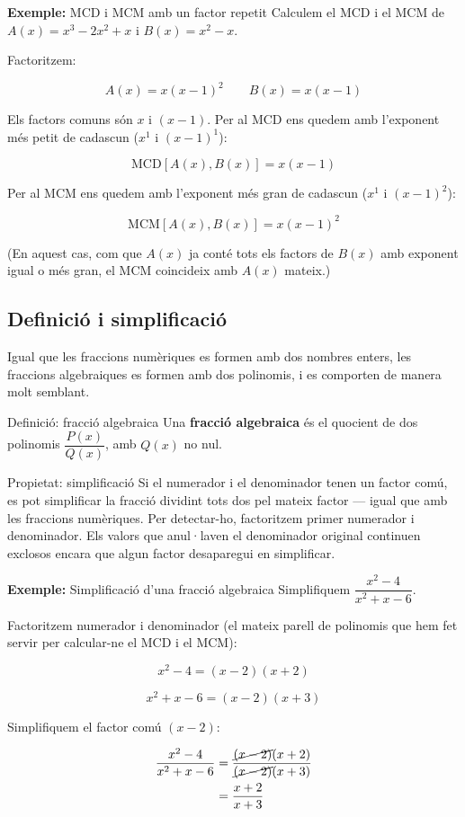 \begin{exemple}{\textbf{Exemple:} MCD i MCM amb un factor repetit}
Calculem el MCD i el MCM de $A(x)=x^3-2x^2+x$ i $B(x)=x^2-x$.

Factoritzem:

\[
A(x) = x(x-1)^2 \qquad B(x) = x(x-1)
\]

Els factors comuns són $x$ i $(x-1)$. Per al MCD ens quedem amb l'exponent més petit de cadascun ($x^1$ i $(x-1)^1$):

\[
\text{MCD}[A(x),B(x)] = x(x-1)
\]

Per al MCM ens quedem amb l'exponent més gran de cadascun ($x^1$ i $(x-1)^2$):

\[
\text{MCM}[A(x),B(x)] = x(x-1)^2
\]

(En aquest cas, com que $A(x)$ ja conté tots els factors de $B(x)$ amb exponent igual o més gran, el MCM coincideix amb $A(x)$ mateix.)
\end{exemple}

\subsection{Definició i simplificació}

Igual que les fraccions numèriques es formen amb dos nombres enters, les fraccions algebraiques es formen amb dos polinomis, i es comporten de manera molt semblant.

\begin{definicio}{Definició: fracció algebraica}
Una \textbf{fracció algebraica} és el quocient de dos polinomis $\dfrac{P(x)}{Q(x)}$, amb $Q(x)$ no nul.
\end{definicio}

\begin{propietat}{Propietat: simplificació}
Si el numerador i el denominador tenen un factor comú, es pot simplificar la fracció dividint tots dos pel mateix factor — igual que amb les fraccions numèriques. Per detectar-ho, factoritzem primer numerador i denominador. Els valors que anul·laven el denominador original continuen exclosos encara que algun factor desaparegui en simplificar.
\end{propietat}

\begin{exemple}{\textbf{Exemple:} Simplificació d'una fracció algebraica}
Simplifiquem $\dfrac{x^2-4}{x^2+x-6}$.

Factoritzem numerador i denominador (el mateix parell de polinomis que hem fet servir per calcular-ne el MCD i el MCM):

\[
x^2-4 = (x-2)(x+2)
\]

\[
x^2+x-6 = (x-2)(x+3)
\]

Simplifiquem el factor comú $(x-2)$:

\[
\begin{aligned}
\frac{x^2-4}{x^2+x-6} &= \frac{\cancel{(x-2)}(x+2)}{\cancel{(x-2)}(x+3)} \\
&= \frac{x+2}{x+3}
\end{aligned}
\]
\end{exemple}

